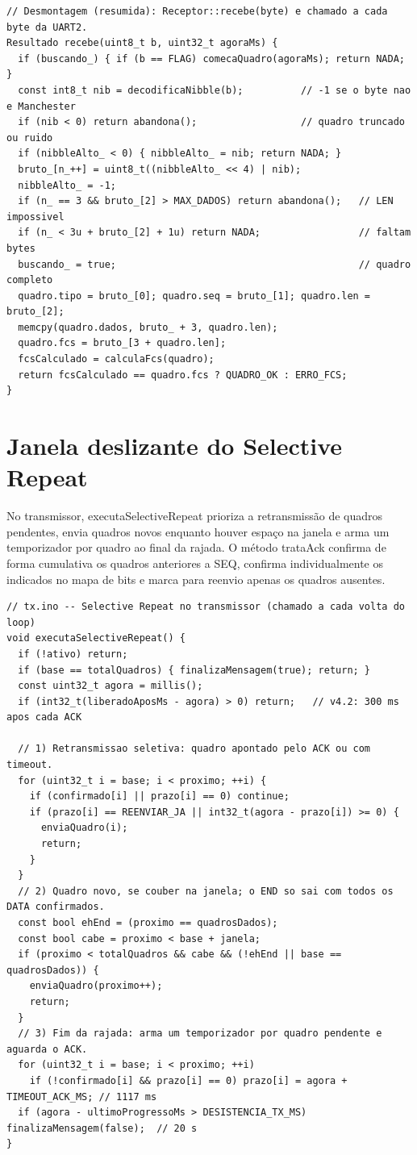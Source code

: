 \documentclass[12pt, oneside, a4paper, sumario=tradicional, chapter=TITLE, brazilian]{abntex2}
\begin{document}
\begin{apendicesenv}
\begin{Verbatim}[fontsize=\scriptsize,frame=single,framesep=2mm,rulecolor=\color{gray!60},breaklines,breakanywhere]
// Desmontagem (resumida): Receptor::recebe(byte) e chamado a cada byte da UART2.
Resultado recebe(uint8_t b, uint32_t agoraMs) {
  if (buscando_) { if (b == FLAG) comecaQuadro(agoraMs); return NADA; }
  const int8_t nib = decodificaNibble(b);          // -1 se o byte nao e Manchester
  if (nib < 0) return abandona();                  // quadro truncado ou ruido
  if (nibbleAlto_ < 0) { nibbleAlto_ = nib; return NADA; }
  bruto_[n_++] = uint8_t((nibbleAlto_ << 4) | nib);
  nibbleAlto_ = -1;
  if (n_ == 3 && bruto_[2] > MAX_DADOS) return abandona();   // LEN impossivel
  if (n_ < 3u + bruto_[2] + 1u) return NADA;                 // faltam bytes
  buscando_ = true;                                          // quadro completo
  quadro.tipo = bruto_[0]; quadro.seq = bruto_[1]; quadro.len = bruto_[2];
  memcpy(quadro.dados, bruto_ + 3, quadro.len);
  quadro.fcs = bruto_[3 + quadro.len];
  fcsCalculado = calculaFcs(quadro);
  return fcsCalculado == quadro.fcs ? QUADRO_OK : ERRO_FCS;
}
\end{Verbatim}

\section{Janela deslizante do Selective Repeat}

No transmissor, executaSelectiveRepeat prioriza a retransmissão de quadros pendentes, envia quadros novos enquanto houver espaço na janela e arma um temporizador por quadro ao final da rajada. O método trataAck confirma de forma cumulativa os quadros anteriores a SEQ, confirma individualmente os indicados no mapa de bits e marca para reenvio apenas os quadros ausentes.

\begin{Verbatim}[fontsize=\scriptsize,frame=single,framesep=2mm,rulecolor=\color{gray!60},breaklines,breakanywhere]
// tx.ino -- Selective Repeat no transmissor (chamado a cada volta do loop)
void executaSelectiveRepeat() {
  if (!ativo) return;
  if (base == totalQuadros) { finalizaMensagem(true); return; }
  const uint32_t agora = millis();
  if (int32_t(liberadoAposMs - agora) > 0) return;   // v4.2: 300 ms apos cada ACK

  // 1) Retransmissao seletiva: quadro apontado pelo ACK ou com timeout.
  for (uint32_t i = base; i < proximo; ++i) {
    if (confirmado[i] || prazo[i] == 0) continue;
    if (prazo[i] == REENVIAR_JA || int32_t(agora - prazo[i]) >= 0) {
      enviaQuadro(i);
      return;
    }
  }
  // 2) Quadro novo, se couber na janela; o END so sai com todos os DATA confirmados.
  const bool ehEnd = (proximo == quadrosDados);
  const bool cabe = proximo < base + janela;
  if (proximo < totalQuadros && cabe && (!ehEnd || base == quadrosDados)) {
    enviaQuadro(proximo++);
    return;
  }
  // 3) Fim da rajada: arma um temporizador por quadro pendente e aguarda o ACK.
  for (uint32_t i = base; i < proximo; ++i)
    if (!confirmado[i] && prazo[i] == 0) prazo[i] = agora + TIMEOUT_ACK_MS; // 1117 ms
  if (agora - ultimoProgressoMs > DESISTENCIA_TX_MS) finalizaMensagem(false);  // 20 s
}


\end{Verbatim}
\end{apendicesenv}
\end{document}
